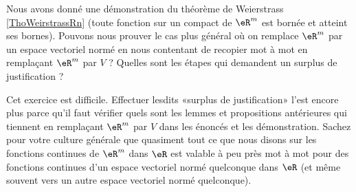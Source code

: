 \begin{exercice}\label{exoGeomAnal-0013}

	Nous avons donné une démonstration du théorème de Weierstrass \ref{ThoWeirstrassRn} (toute fonction sur un compact de $\eR^m$ est bornée et atteint ses bornes). Pouvons nous prouver le cas plus général où on remplace $\eR^m$ par un espace vectoriel normé en nous contentant de recopier mot à mot en remplaçant $\eR^m$ par $V$ ? Quelles sont les étapes qui demandent un surplus de justification ?

	Cet exercice est difficile. Effectuer lesdits «surplus de justification» l'est encore plus parce qu'il faut vérifier quels sont les lemmes et propositions antérieures qui tiennent en remplaçant $\eR^m$ par $V$ dans les énoncés et les démonstration. Sachez pour votre culture générale que quasiment tout ce que nous disons sur les fonctions continues de $\eR^m$ dans $\eR$ est valable à peu près mot à mot pour des fonctions continues d'un espace vectoriel normé quelconque dans $\eR$ (et même souvent vers un autre espace vectoriel normé quelconque).

\end{exercice}

